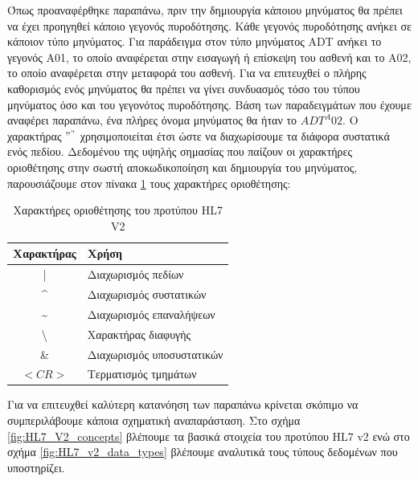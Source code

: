 	Όπως προαναφέρθηκε παραπάνω, πριν την δημιουργία κάποιου μηνύματος θα πρέπει να έχει προηγηθεί κάποιο γεγονός πυροδότησης. Κάθε γεγονός πυροδότησης ανήκει σε κάποιον τύπο μηνύματος. Για παράδειγμα στον τύπο μηνύματος ADT ανήκει το γεγονός A01, το οποίο αναφέρεται στην εισαγωγή ή επίσκεψη του ασθενή και το Α02, το οποίο αναφέρεται στην μεταφορά του ασθενή. Για να επιτευχθεί ο πλήρης καθορισμός ενός μηνύματος θα πρέπει να γίνει συνδυασμός τόσο του τύπου μηνύματος όσο και του γεγονότος πυροδότησης. Βάση των παραδειγμάτων που έχουμε αναφέρει παραπάνω, ένα πλήρες όνομα μηνύματος θα ήταν το $ADT^A02$. Ο χαρακτήρας $"^"$ χρησιμοποιείται έτσι ώστε να διαχωρίσουμε τα διάφορα συστατικά ενός πεδίου. Δεδομένου της υψηλής σημασίας που παίζουν οι χαρακτήρες οριοθέτησης στην σωστή αποκωδικοποίηση και δημιουργία του μηνύματος, παρουσιάζουμε στον πίνακα \ref{tab:HL7_delimeters} τους χαρακτήρες οριοθέτησης:
	\begin{table}[H]
		\begin{center}
		    \begin{tabular}{|c|l|}
		    \hline
		    \rowcolor{grayy}
		    \textbf{Χαρακτήρας} & \textbf{Χρήση}
		    \\ \hline
		     | & Διαχωρισμός πεδίων
		     \\ \hline
		     \^{} & Διαχωρισμός συστατικών
		     \\ \hline
		     \~{} & Διαχωρισμός επαναλήψεων
		     \\ \hline
		     \textbackslash & Χαρακτήρας διαφυγής
		     \\ \hline
		     \& & Διαχωρισμός υποσυστατικών
		     \\ \hline
		     $<CR>$ & Τερματισμός τμημάτων
		     \\ \hline
		    \end{tabular}
		    \caption{Χαρακτήρες οριοθέτησης του προτύπου HL7 V2}
			\label{tab:HL7_delimeters}
		\end{center}
	\end{table}
	
	Για να επιτευχθεί καλύτερη κατανόηση των παραπάνω κρίνεται σκόπιμο να συμπεριλάβουμε κάποια σχηματική αναπαράσταση. Στο σχήμα \ref{fig:HL7_V2_concepts} βλέπουμε τα βασικά στοιχεία του προτύπου HL7 v2 ενώ στο σχήμα \ref{fig:HL7_v2_data_types} βλέπουμε αναλυτικά τους τύπους δεδομένων που υποστηρίζει.
	

